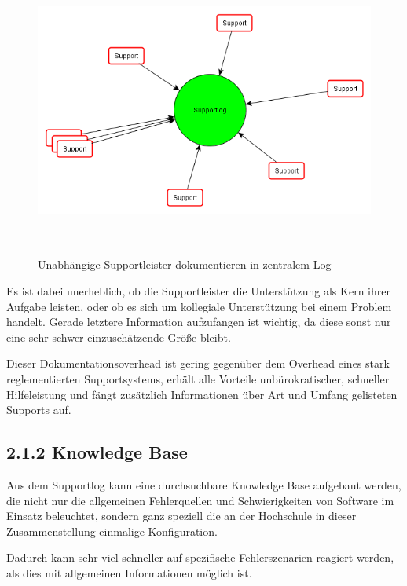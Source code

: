 \documentclass[a4paper]{article}
\begin{document}
\begin{figure}
\centering
\includegraphics[width=15.501cm,height=9.678cm]{VorlaufigeSollSituationeblingsprafkeluebke-img/VorlaufigeSollSituationeblingsprafkeluebke-img002.png}
\caption[Unabhängige Supportleister dokumentieren in zentralem Log]{Unabhängige Supportleister dokumentieren in
zentralem Log}

\end{figure}
{\sffamily
Es ist dabei unerheblich, ob die Supportleister die Unterstützung als Kern ihrer Aufgabe leisten, oder ob es sich um
kollegiale Unterstützung bei einem Problem handelt. Gerade letztere Information aufzufangen ist wichtig, da diese sonst
nur eine sehr schwer einzuschätzende Größe bleibt.}

{\sffamily
Dieser Dokumentationsoverhead ist gering gegenüber dem Overhead eines stark reglementierten Supportsystems, erhält alle
Vorteile unbürokratischer, schneller Hilfeleistung und fängt zusätzlich Informationen über Art und Umfang gelisteten
Supports auf.}

\subsection{2.1.2 Knowledge Base}
{\sffamily
Aus dem Supportlog kann eine durchsuchbare Knowledge Base aufgebaut werden, die nicht nur die allgemeinen Fehlerquellen
und Schwierigkeiten von Software im Einsatz beleuchtet, sondern ganz speziell die an der Hochschule in dieser
Zusammenstellung einmalige Konfiguration.}

{\sffamily
Dadurch kann sehr viel schneller auf spezifische Fehlerszenarien reagiert werden, als dies mit allgemeinen Informationen
möglich ist.}
\end{document}
